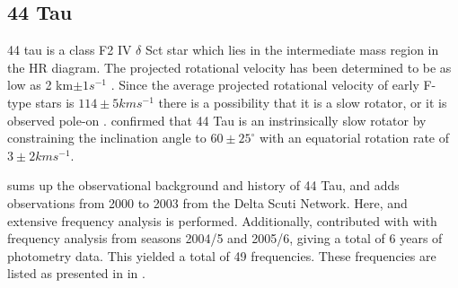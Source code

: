 \subsection{44 Tau}

44 tau is a class F2 IV $\delta$ Sct star which lies in the intermediate mass region in the HR diagram. The projected rotational velocity has been determined to be as low as 2 km$ \pm 1 s^{-1}$ \citep{lenz2008asteroseismic}. Since the average projected rotational velocity of early F-type stars is $114 \pm 5 km s^{-1}$ \citep{royer2004rotational} there is a possibility that it is a slow rotator, or it is observed pole-on \citep{antoci200744}. \citet{zima2007high} confirmed that 44 Tau is an instrinsically slow rotator by constraining the inclination angle to $60 \pm 25^{\circ}$ with an equatorial rotation rate of $3 \pm 2 km s^{-1}$. 

\citet{antoci200744} sums up the observational background and history of 44 Tau, and adds observations from 2000 to 2003 from the Delta Scuti Network. Here, and extensive frequency analysis is performed. Additionally, \citet{breger2008A&A} contributed with with frequency analysis from seasons  2004/5 and 2005/6, giving a total of 6 years of photometry data. This yielded a total of 49 frequencies. These frequencies are listed as presented in \citep{lenz2010delta} in .


